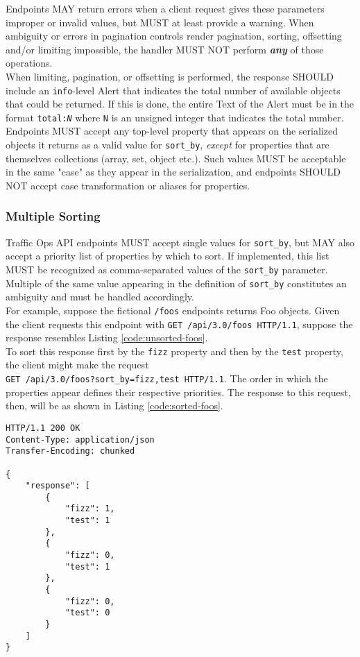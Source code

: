 \documentclass{article}
\newenvironment{codelisting}{\captionsetup{type=listing}}{}
\newcommand{\code}[1]{\texttt{\color{inlinecodecolor}#1}}
\begin{document}
Endpoints MAY return errors when a client request gives these parameters improper or invalid values, but MUST at least provide a warning.
When ambiguity or errors in pagination controls render pagination, sorting, offsetting and/or limiting impossible, the handler MUST NOT
perform \emph{\textbf{any}} of those operations.\\
When limiting, pagination, or offsetting is performed, the response SHOULD include an \code{info}-level Alert that indicates the total
number of available objects that could be returned. If this is done, the entire Text of the Alert must be in the format \code{total:\emph{N}}
where \code{N} is an unsigned integer that indicates the total number.\\
Endpoints MUST accept any top-level property that appears on the serialized objects it returns as a valid value for \code{sort\_by},
\emph{except} for properties that are themselves collections (array, set, object etc.). Such values MUST be acceptable in the same "case"
as they appear in the serialization, and endpoints SHOULD NOT accept case transformation or aliases for properties.\\

\subsubsection{Multiple Sorting}
Traffic Ops API endpoints MUST accept single values for \code{sort\_by}, but MAY also accept a priority list of properties by which to sort.
If implemented, this list MUST be recognized as comma-separated values of the \code{sort\_by} parameter. Multiple of the same value appearing
in the definition of \code{sort\_by} constitutes an ambiguity and must be handled accordingly.\\
For example, suppose the fictional \code{/foos} endpoints returns Foo objects. Given the client requests this endpoint with
\code{GET /api/3.0/foos HTTP/1.1}, suppose the response resembles Listing \ref{code:unsorted-foos}.\\
To sort this response first by the \code{fizz} property and then by the \code{test} property, the client might make the request\\
\code{GET /api/3.0/foos?sort\_by=fizz,test HTTP/1.1}. The order in which the properties appear defines their respective
priorities. The response to this request, then, will be as shown in Listing \ref{code:sorted-foos}.

\begin{codelisting}
\label{code:unsorted-foos}
\begin{verbatim}
HTTP/1.1 200 OK
Content-Type: application/json
Transfer-Encoding: chunked

{
	"response": [
		{
			"fizz": 1,
			"test": 1
		},
		{
			"fizz": 0,
			"test": 1
		},
		{
			"fizz": 0,
			"test": 0
		}
	]
}
\end{verbatim}
\end{codelisting}
\end{document}
